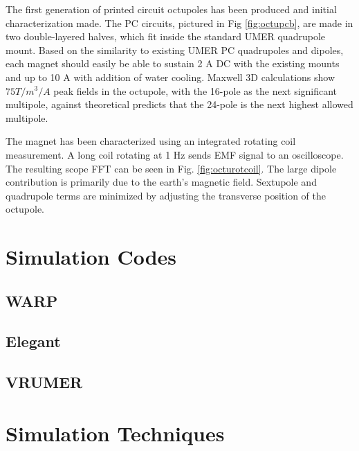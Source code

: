 The first generation of printed circuit octupoles has been produced and initial characterization made. The PC circuits, pictured in Fig \ref{fig:octupcb}, are made in two double-layered halves, which fit inside the standard UMER quadrupole mount. Based on the similarity to existing UMER PC quadrupoles and dipoles, each magnet should easily be able to sustain 2 A DC with the existing mounts and up to 10 A with addition of water cooling. Maxwell 3D calculations show $75 T/m^3/A$ peak fields in the octupole, with the 16-pole as the next significant multipole, against theoretical predicts that the 24-pole is the next highest allowed multipole. \cite{VenturiniThesis}

The magnet has been characterized using an integrated rotating coil measurement. A long coil rotating at 1 Hz sends EMF signal to an oscilloscope. The resulting scope FFT can be seen in Fig. \ref{fig:octurotcoil}. The large dipole contribution is primarily due to the earth’s magnetic field. Sextupole and quadrupole terms are minimized by adjusting the transverse position of the octupole.


\cite{BaumgartnerNAPAC2016}

\section{Simulation Codes}
\subsection{WARP}
\cite{warp}

\subsection{Elegant}
\cite{elegant}

\subsection{VRUMER}
\section{Simulation Techniques}
